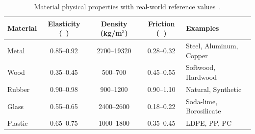 \documentclass[conference]{IEEEtran}
\begin{document}
\begin{table}[H]
\centering
\renewcommand{\arraystretch}{1.6}
\setlength{\tabcolsep}{2pt}
\caption{Material physical properties with real-world reference values~\protect\cite{ashby2018engineering,callister2020materials}.}
\label{tab:material_physical}
\begin{tabular}{|l|c|c|c|p{2.2cm}|}
\hline
\textbf{Material} & \textbf{Elasticity} (–) & \textbf{Density} (kg/m$^3$) & \textbf{Friction} (–) & \textbf{Examples} \\
\hline
Metal   & 0.85–0.92 & 2700–19320 & 0.28–0.32 & Steel, Aluminum, Copper \\
Wood    & 0.35–0.45 & 500–700    & 0.45–0.55 & Softwood, Hardwood \\
Rubber  & 0.90–0.98 & 900–1200   & 0.90–1.10 & Natural, Synthetic \\
Glass   & 0.55–0.65 & 2400–2600  & 0.18–0.22 & Soda-lime, Borosilicate \\
Plastic & 0.65–0.75 & 1000–1800  & 0.35–0.45 & LDPE, PP, PC \\
\hline
\end{tabular}
\end{table}







\end{document}
